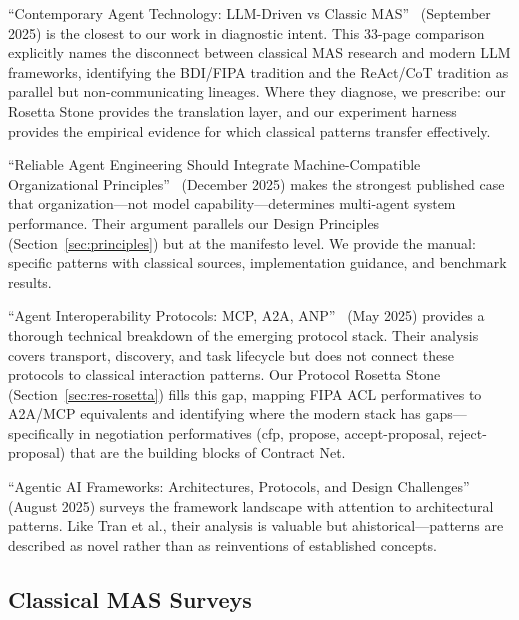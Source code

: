 \documentclass{article}
\begin{document}
``Contemporary Agent Technology: LLM-Driven vs Classic
MAS''~\citep{contemporary2025} (September 2025) is the closest to our work in
diagnostic intent. This 33-page comparison explicitly names the disconnect between
classical MAS research and modern LLM frameworks, identifying the BDI/FIPA tradition
and the ReAct/CoT tradition as parallel but non-communicating lineages. Where they
diagnose, we prescribe: our Rosetta Stone provides the translation layer, and our
experiment harness provides the empirical evidence for which classical patterns
transfer effectively.

``Reliable Agent Engineering Should Integrate Machine-Compatible Organizational
Principles''~\citep{reliableagent2025} (December 2025) makes the strongest published
case that organization---not model capability---determines multi-agent system
performance. Their argument parallels our Design Principles (Section~\ref{sec:principles})
but at the manifesto level. We provide the manual: specific patterns with classical
sources, implementation guidance, and benchmark results.

``Agent Interoperability Protocols: MCP, A2A, ANP''~\citep{agentinterop2025} (May 2025)
provides a thorough technical breakdown of the emerging protocol stack. Their analysis
covers transport, discovery, and task lifecycle but does not connect these protocols to
classical interaction patterns. Our Protocol Rosetta Stone
(Section~\ref{sec:res-rosetta}) fills this gap, mapping FIPA ACL performatives to
A2A/MCP equivalents and identifying where the modern stack has gaps---specifically in
negotiation performatives (cfp, propose, accept-proposal, reject-proposal) that are the
building blocks of Contract Net.

``Agentic AI Frameworks: Architectures, Protocols, and Design
Challenges''~\citep{agenticaiframeworks2025} (August 2025) surveys the framework
landscape with attention to architectural patterns. Like Tran et al., their analysis
is valuable but ahistorical---patterns are described as novel rather than
as reinventions of established concepts.

\subsection{Classical MAS Surveys}
\label{sec:rel-classical}

%
%
\end{document}
